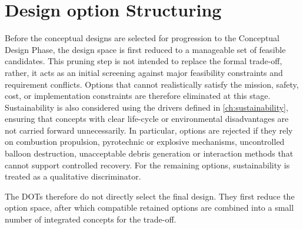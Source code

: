 
\vspace{-20pt}
\chapter{Design option Structuring} \label{ch:Design Options}
\vspace{-12pt}


Before the conceptual designs are selected for progression to the Conceptual Design Phase, the design space is first reduced to a manageable set of feasible candidates. This pruning step is not intended to replace the formal trade-off, rather, it acts as an initial screening against major feasibility constraints and requirement conflicts. Options that cannot realistically satisfy the mission, safety, cost, or implementation constraints are therefore eliminated at this stage. Sustainability is also considered using the drivers defined in \autoref{ch:sustainability}, ensuring that concepts with clear life-cycle or environmental disadvantages are not carried forward unnecessarily. In particular, options are rejected if they rely on combustion propulsion, pyrotechnic or explosive mechanisms, uncontrolled balloon destruction, unacceptable debris generation or interaction methods that cannot support controlled recovery. For the remaining options, sustainability is treated as a qualitative discriminator.

The DOTs therefore do not directly select the final design. They first reduce the option space, after which compatible retained options are combined into a small number of integrated concepts for the trade-off.





